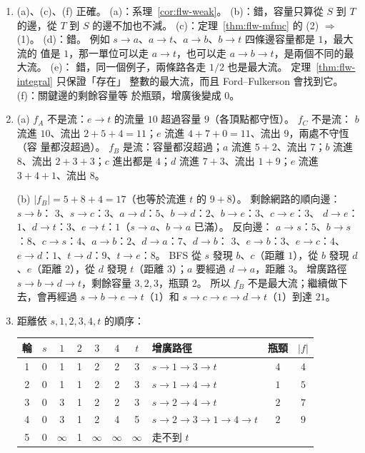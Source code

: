 \begin{enumerate}
\item (a)、(c)、(f) 正確。 (a)：系理~\ref{cor:flw-weak}。 (b)：錯，容量只算從 $S$ 到
$T$ 的邊，從 $T$ 到 $S$ 的邊不加也不減。 (c)：定理~\ref{thm:flw-mfmc} 的 (2) $\Rightarrow$
(1)。 (d)：錯。 例如 $s \to a$、$a \to t$、$a \to b$、$b \to t$ 四條邊容量都是 $1$，最大流的
值是 $1$，那一單位可以走 $a \to t$，也可以走 $a \to b \to t$，是兩個不同的最大流。 (e)：
錯，同一個例子，兩條路各走 $1/2$ 也是最大流。 定理~\ref{thm:flw-integral} 只保證「存在」
整數的最大流，而且 Ford--Fulkerson 會找到它。 (f)：關鍵邊的剩餘容量等
於瓶頸，增廣後變成 $0$。

\item (a) $f_A$ 不是流：$e \to t$ 的流量 $10$ 超過容量 $9$（各頂點都守恆）。 $f_C$ 不是流：
$b$ 流進 $10$、流出 $2 + 5 + 4 = 11$；$e$ 流進 $4 + 7 + 0 = 11$、流出 $9$，兩處不守恆（容
量都沒超過）。 $f_B$ 是流：容量都沒超過；$a$ 流進 $5 + 2$、流出 $7$；$b$ 流進 $8$、流出
$2 + 3 + 3$；$c$ 進出都是 $4$；$d$ 流進 $7 + 3$、流出 $1 + 9$；$e$ 流進 $3 + 4 + 1$、流出
$8$。

(b) $|f_B| = 5 + 8 + 4 = 17$（也等於流進 $t$ 的 $9 + 8$）。 剩餘網路的順向邊：$s \to b$：
$3$、$s \to c$：$3$、$a \to d$：$5$、$b \to d$：$2$、$b \to e$：$3$、$c \to e$：$3$、
$d \to e$：$1$、$d \to t$：$3$、$e \to t$：$1$（$s \to a$、$b \to a$ 已滿）。 反向邊：
$a \to s$：$5$、$b \to s$：$8$、$c \to s$：$4$、$a \to b$：$2$、$d \to a$：$7$、$d \to b$：
$3$、$e \to b$：$3$、$e \to c$：$4$、$e \to d$：$1$、$t \to d$：$9$、$t \to e$：$8$。 BFS 從
$s$ 發現 $b$、$c$（距離 $1$），從 $b$ 發現 $d$、$e$（距離 $2$），從 $d$ 發現 $t$（距離
$3$）；$a$ 要經過 $d \to a$，距離 $3$。 增廣路徑 $s \to b \to d \to t$，剩餘容量
$3, 2, 3$，瓶頸 $2$。 所以 $f_B$ 不是最大流；繼續做下去，會再經過
$s \to b \to e \to t$（$1$）和 $s \to c \to e \to d \to t$（$1$）到達 $21$。

\item 距離依 $s, 1, 2, 3, 4, t$ 的順序：

\begin{center}
\small
\begin{tabular}{c|cccccc|lcc}
\toprule
輪 & $s$ & $1$ & $2$ & $3$ & $4$ & $t$ & 增廣路徑 & 瓶頸 & $|f|$ \\
\midrule
1 & 0 & 1 & 1 & 2 & 2 & 3 & $s \to 1 \to 3 \to t$ & $4$ & $4$ \\
2 & 0 & 1 & 1 & 2 & 2 & 3 & $s \to 1 \to 4 \to t$ & $1$ & $5$ \\
3 & 0 & 3 & 1 & 2 & 2 & 3 & $s \to 2 \to 4 \to t$ & $2$ & $7$ \\
4 & 0 & 3 & 1 & 2 & 4 & 5 & $s \to 2 \to 3 \to 1 \to 4 \to t$ & $2$ & $9$ \\
5 & 0 & $\infty$ & 1 & $\infty$ & $\infty$ & $\infty$ & 走不到 $t$ & & \\
\bottomrule
\end{tabular}
\end{center}


\end{enumerate}
